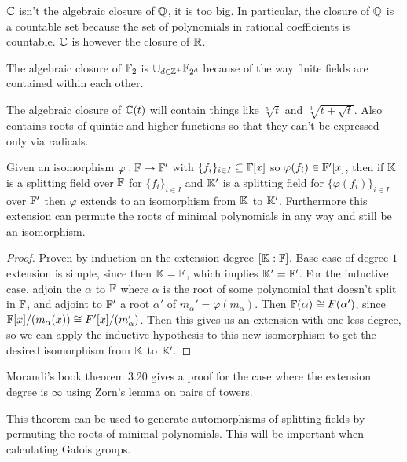 \documentclass[11pt]{article}
\begin{document}
\begin{example}
  $\mathbb{C}$ isn't the algebraic closure of $\mathbb{Q}$, it is too big. In particular, the closure of $\mathbb{Q}$ is a countable set because the set of polynomials in rational coefficients is countable. $\mathbb{C}$ is however the closure of $\mathbb{R}$.
\end{example}

\begin{example}
  The algebraic closure of $\mathbb{F}_{2}$ is $\cup_{d \in \mathbb{Z}^+} \mathbb{F}_{2^d}$ because of the way finite fields are contained within each other.
\end{example}

\begin{example}
  The algebraic closure of $\mathbb{C}(t)$ will contain things like $\sqrt[5]{t}$ and $\sqrt[3]{t + \sqrt{t}}$. Also contains roots of quintic and higher functions so that they can't be expressed only via radicals.
\end{example}

\begin{theorem}
  Given an isomorphism $\varphi : \mathbb{F} \rightarrow \mathbb{F}'$ with $\{f_i\}_{i \in I} \subseteq \mathbb{F}[x]$ so $\varphi(f_i) \in \mathbb{F}'[x]$, then if $\mathbb{K}$ is a splitting field over $\mathbb{F}$ for $\{f_i\}_{i \in I}$ and $\mathbb{K}'$ is a splitting field for $\{\varphi(f_i)\}_{i \in I}$ over $\mathbb{F}'$ then $\varphi$ extends to an isomorphism from $\mathbb{K}$ to $\mathbb{K}'$. Furthermore this extension can permute the roots of minimal polynomials in any way and still be an isomorphism.
\end{theorem}
\begin{proof}
  Proven by induction on the extension degree $[\mathbb{K} : \mathbb{F}]$. Base case of degree $1$ extension is simple, since then $\mathbb{K} = \mathbb{F}$, which implies $\mathbb{K}' = \mathbb{F}'$. For the inductive case, adjoin the $\alpha$ to $\mathbb{F}$ where $\alpha$ is the root of some polynomial that doesn't split in $\mathbb{F}$, and adjoint to $\mathbb{F}'$ a root $\alpha'$ of $m_\alpha' = \varphi(m_\alpha)$. Then $\mathbb{F}(\alpha) \cong F(\alpha')$, since $\mathbb{F}[x]/(m_\alpha(x)) \cong F'[x]/(m_\alpha')$. Then this gives us an extension with one less degree, so we can apply the inductive hypothesis to this new isomorphism to get the desired isomorphism from $\mathbb{K}$ to $\mathbb{K}'$.
\end{proof}
\begin{remark}
  Morandi's book theorem 3.20 gives a proof for the case where the extension degree is $\infty$ using Zorn's lemma on pairs of towers.
\end{remark}
\begin{remark}
  This theorem can be used to generate automorphisms of splitting fields by permuting the roots of minimal polynomials. This will be important when calculating Galois groups.
\end{remark}
\end{document}

